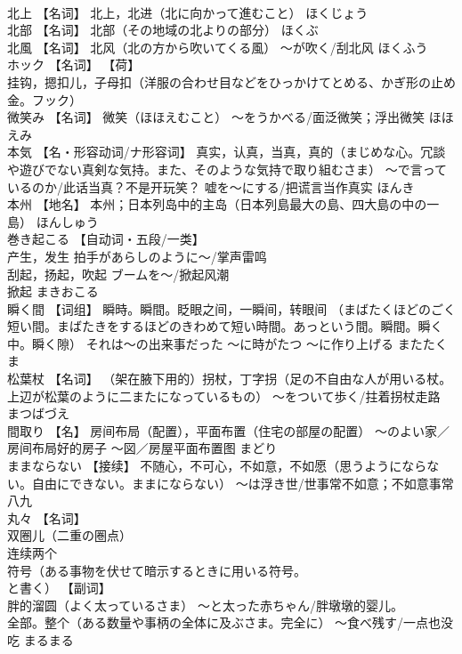 \documentclass[8pt]{extreport}
\begin{document}
\begin{CJK}{UTF8}{min}
\\	北上	【名词】 北上，北进（北に向かって進むこと）	ほくじょう	
\\	北部	【名词】 北部（その地域の北よりの部分）	ほくぶ	
\\	北風	【名词】 北风（北の方から吹いてくる風） ～が吹く/刮北风	ほくふう	
\\	ホック	【名词】 【荷】
\\	挂钩，摁扣儿，子母扣（洋服の合わせ目などをひっかけてとめる、かぎ形の止め金。フック）		
\\	微笑み	【名词】 微笑（ほほえむこと） ～をうかべる/面泛微笑；浮出微笑	ほほえみ	
\\	本気	【名・形容动词/ナ形容词】 真实，认真，当真，真的（まじめな心。冗談や遊びでない真剣な気持。また、そのような気持で取り組むさま） ～で言っているのか/此话当真？不是开玩笑？ 嘘を～にする/把谎言当作真实	ほんき	
\\	本州	【地名】 本州；日本列岛中的主岛（日本列島最大の島、四大島の中の一島）	ほんしゅう	
\\	巻き起こる	【自动词・五段/一类】 
\\	产生，发生 拍手があらしのように～/掌声雷鸣 
\\	刮起，扬起，吹起 ブームを～/掀起风潮 
\\	掀起	まきおこる	
\\	瞬く間	【词组】 瞬時。瞬間。眨眼之间，一瞬间，转眼间 （まばたくほどのごく短い間。まばたきをするほどのきわめて短い時間。あっという間。瞬間。瞬く中。瞬く隙） それは～の出来事だった ～に時がたつ ～に作り上げる	またたくま	
\\	松葉杖	【名词】 （架在腋下用的）拐杖，丁字拐（足の不自由な人が用いる杖。上辺が松葉のように二またになっているもの） ～をついて歩く/拄着拐杖走路	まつばづえ	
\\	間取り	【名】 房间布局（配置），平面布置（住宅の部屋の配置） ～のよい家／房间布局好的房子 ～図／房屋平面布置图	まどり	
\\	ままならない	【接续】 不随心，不可心，不如意，不如愿（思うようにならない。自由にできない。ままにならない） ～は浮き世/世事常不如意；不如意事常八九		
\\	丸々	【名词】 
\\	双圈儿（二重の圏点） 
\\	连续两个
\\	符号（ある事物を伏せて暗示するときに用いる符号。
\\	と書く） 【副词】 
\\	胖的溜圆（よく太っているさま） ～と太った赤ちゃん/胖墩墩的婴儿。 
\\	全部。整个（ある数量や事柄の全体に及ぶさま。完全に） ～食べ残す/一点也没吃	まるまる	

\end{CJK}
\end{document}
